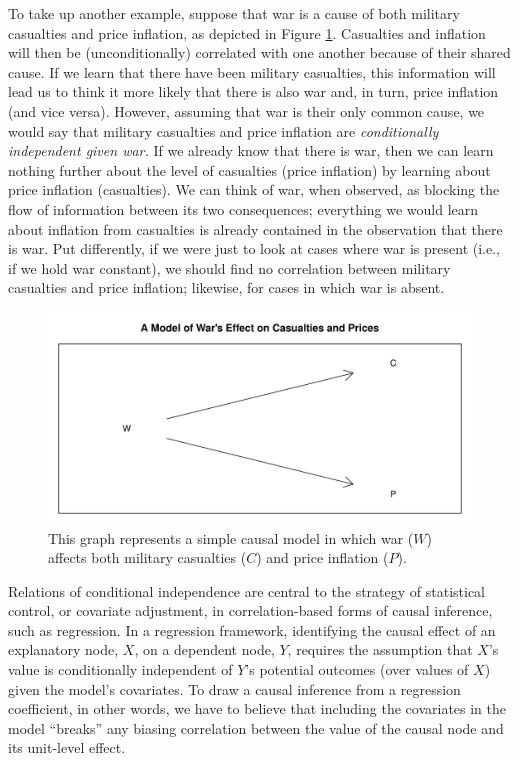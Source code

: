 \documentclass[
  12pt,
]{book}
\begin{document}
To take up another example, suppose that war is a cause of both military casualties and price inflation, as depicted in Figure \ref{fig:warDAG}. Casualties and inflation will then be (unconditionally) correlated with one another because of their shared cause. If we learn that there have been military casualties, this information will lead us to think it more likely that there is also war and, in turn, price inflation (and vice versa). However, assuming that war is their only common cause, we would say that military casualties and price inflation are \emph{conditionally independent given war.} If we already know that there is war, then we can learn nothing further about the level of casualties (price inflation) by learning about price inflation (casualties). We can think of war, when observed, as blocking the flow of information between its two consequences; everything we would learn about inflation from casualties is already contained in the observation that there is war. Put differently, if we were just to look at cases where war is present (i.e., if we hold war constant), we should find no correlation between military casualties and price inflation; likewise, for cases in which war is absent.

\begin{figure}

{\centering \includegraphics[width=0.6\linewidth]{ii_files/figure-latex/warDAG-1} 

}

\caption{This graph represents a simple causal model in which war ($W$) affects both military casualties ($C$) and price inflation ($P$).}\label{fig:warDAG}
\end{figure}

Relations of conditional independence are central to the strategy of statistical control, or covariate adjustment, in correlation-based forms of causal inference, such as regression. In a regression framework, identifying the causal effect of an explanatory node, \(X\), on a dependent node, \(Y\), requires the assumption that \(X\)'s value is conditionally independent of \(Y\)'s potential outcomes (over values of \(X\)) given the model's covariates. To draw a causal inference from a regression coefficient, in other words, we have to believe that including the covariates in the model ``breaks'' any biasing correlation between the value of the causal node and its unit-level effect.
\end{document}
